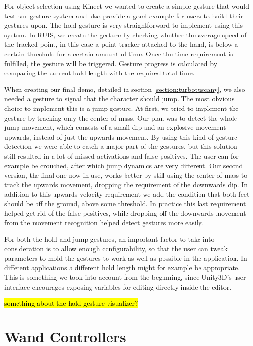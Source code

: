 \documentclass[12pt,a4paper,oneside,pdftex]{report}
\begin{document}
For object selection using Kinect we wanted to create a simple gesture that would test our gesture system and also provide a good example for users to build their gestures upon. The hold gesture is very straightforward to implement using this system. In RUIS, we create the gesture by checking whether the average speed of the tracked point, in this case a point tracker attached to the hand, is below a certain threshold for a certain amount of time. Once the time requirement is fulfilled, the gesture will be triggered. Gesture progress is calculated by comparing the current hold length with the required total time. 

When creating our final demo, detailed in section \ref{section:turbotuscany}, we also needed a gesture to signal that the character should jump. The most obvious choice to implement this is a jump gesture. At first, we tried to implement the gesture by tracking only the center of mass. Our plan was to detect the whole jump movement, which consists of a small dip and an explosive movement upwards, instead of just the upwards movement. By using this kind of gesture detection we were able to catch a major part of the gestures, but this solution still resulted in a lot of missed activations and false positives. The user can for example be crouched, after which jump dynamics are very different. Our second version, the final one now in use, works better by still using the center of mass to track the upwards movement, dropping the requirement of the downwards dip. In addition to this upwards velocity requirement we add the condition that both feet should be off the ground, above some threshold. In practice this last requirement helped get rid of the false positives, while dropping off the downwards movement from the movement recognition helped detect gestures more easily.

For both the hold and jump gestures, an important factor to take into consideration is to allow enough configurability, so that the user can tweak parameters to mold the gestures to work as well as possible in the application. In different applications a different hold length might for example be appropriate. This is something we took into account from the beginning, since Unity3D's user interface encourages exposing variables for editing directly inside the editor.

\hl{something about the hold gesture visualizer?}

\section{Wand Controllers}
\label{section:wandcontrollers}
\end{document}
